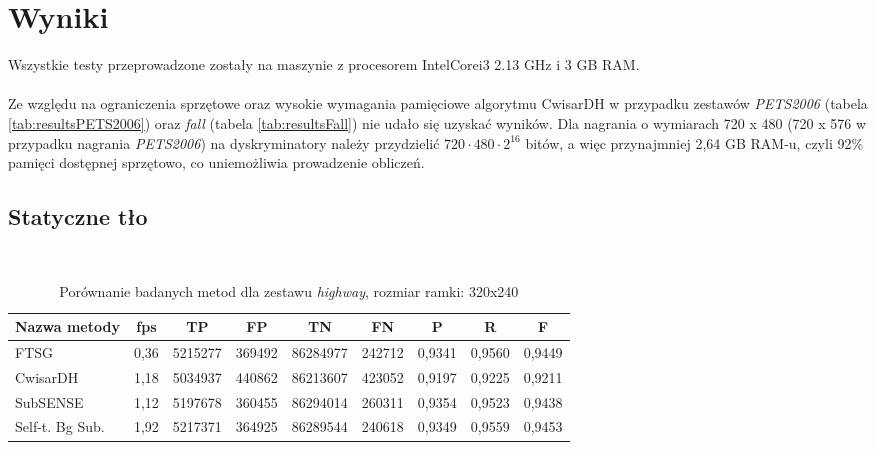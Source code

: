 \section{Wyniki}
Wszystkie testy przeprowadzone zostały na maszynie z procesorem Intel\textregistered Core\texttrademark i3 2.13 GHz i 3 GB RAM.
\paragraph{}
Ze względu na ograniczenia sprzętowe oraz wysokie wymagania pamięciowe algorytmu CwisarDH w przypadku zestawów \textit{PETS2006} (tabela \ref{tab:resultsPETS2006}) oraz \textit{fall} (tabela \ref{tab:resultsFall}) nie udało się uzyskać wyników. Dla nagrania o wymiarach 720 x 480 (720 x 576 w przypadku nagrania \textit{PETS2006}) na dyskryminatory należy przydzielić $720 \cdot 480 \cdot 2^{16}$ bitów, a więc przynajmniej 2,64 GB RAM-u, czyli 92\% pamięci dostępnej sprzętowo, co uniemożliwia prowadzenie obliczeń.

\subsection{Statyczne tło}
~
\FloatBarrier
\begin{table}[!h]
\small
\caption{Porównanie badanych metod dla zestawu \textit{highway}, rozmiar ramki: 320x240}
\label{tab:resultsHighway}
\centering
\begin{tabular*}{\textwidth}{@{\extracolsep{\fill}} |l*{8}{|c}|}
  \hline 
  \textbf{Nazwa metody} & \textbf{fps} & \textbf{TP} & \textbf{FP} & \textbf{TN} & \textbf{FN} & \textbf{P} & \textbf{R} & \textbf{F}\\
  \hline
  FTSG & 0,36 & 5215277 & 369492 & 86284977 & 242712 & 0,9341 & 0,9560 & 0,9449\\ 
\hline
CwisarDH & 1,18 & 5034937 & 440862 & 86213607 & 423052 & 0,9197 & 0,9225 & 0,9211\\ 
\hline
SubSENSE & 1,12 & 5197678 & 360455 & 86294014 & 260311 & 0,9354 & 0,9523 & 0,9438\\ 
\hline
Self-t. Bg Sub. & 1,92 & 5217371 & 364925 & 86289544 & 240618 & 0,9349 & 0,9559 & 0,9453\\ 
\hline
\end{tabular*}
\end{table}

